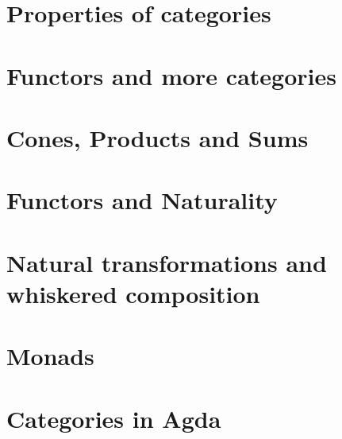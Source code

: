 \documentclass[11pt,twoside]{report}
\theoremstyle{definition}
\begin{document}
\chapter{Properties of categories}


\chapter{Functors and more categories}


\chapter{Cones, Products and Sums}


\chapter{Functors and Naturality}


\chapter{Natural transformations and whiskered composition}


\chapter{Monads}


\chapter{Categories in Agda}

\end{document}
